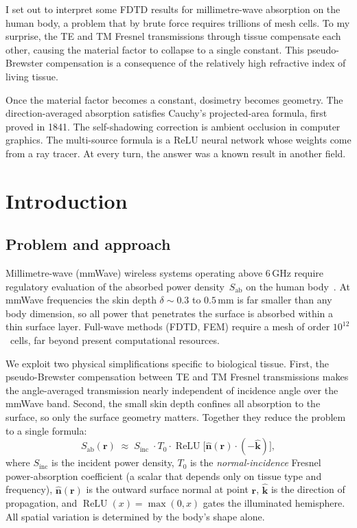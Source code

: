 \documentclass[11pt,a4paper]{article}
\theoremstyle{definition}
\newcommand{\khat}{\hat{\bm{k}}}
\newcommand{\nhat}{\hat{\bm{n}}}
\newcommand{\rr}{\mathbf{r}}
\newcommand{\Sinc}{S_{\mathrm{inc}}}
\newcommand{\Sab}{S_{\mathrm{ab}}}
\DeclareMathOperator{\ReLU}{ReLU}
\begin{document}
I set out to interpret some FDTD results for millimetre-wave absorption
on the human body, a problem that by brute force requires trillions of
mesh cells.  To my surprise, the TE and TM Fresnel transmissions through
tissue compensate each other, causing the material factor to collapse to
a single constant.  This pseudo-Brewster compensation is a consequence
of the relatively high refractive index of living tissue.

Once the material factor becomes a constant, dosimetry becomes geometry.
The direction-averaged absorption satisfies Cauchy's projected-area
formula, first proved in 1841.  The self-shadowing correction is ambient
occlusion in computer graphics.  The multi-source formula is a ReLU
neural network whose weights come from a ray tracer.  At every turn, the
answer was a known result in another field.

\newpage

\section{Introduction}\label{sec:introduction}

\subsection{Problem and approach}

Millimetre-wave (mmWave) wireless systems operating above 6\,GHz
require regulatory evaluation of the absorbed power density~$\Sab$
on the human body~\cite{ICNIRP2020}.  At mmWave frequencies the skin
depth $\delta\sim 0.3$ to $0.5$\,mm is far smaller than any body
dimension, so all power that penetrates the surface is absorbed within a
thin surface layer.  Full-wave methods (FDTD, FEM) require a mesh
of order $10^{12}$~cells, far beyond present computational resources.

We exploit two physical simplifications specific to biological tissue.
First, the pseudo-Brewster compensation between TE and TM Fresnel
transmissions makes the angle-averaged transmission nearly independent
of incidence angle over the mmWave band.  Second, the small skin depth
confines all absorption to the surface, so only the surface geometry
matters.  Together they reduce the problem to a single formula:
\begin{equation}\label{eq:geometric-law}
  \boxed{\Sab(\rr)
    \;\approx\; \Sinc\;\cdot T_0\cdot
    \ReLU\!\bigl[\nhat(\rr)\cdot(-\khat)\bigr],}
\end{equation}
where $\Sinc$ is the incident power density, $T_0$ is the
\emph{normal-incidence} Fresnel power-absorption coefficient (a scalar
that depends only on tissue type and frequency), $\nhat(\rr)$ is the
outward surface normal at point $\rr$, $\khat$ is the direction of
propagation, and $\ReLU(x)=\max(0,x)$ gates the illuminated hemisphere.
All spatial variation is determined by the body's shape alone.
\end{document}
